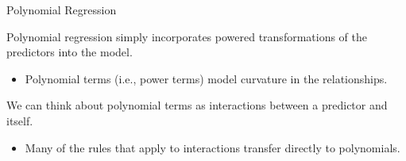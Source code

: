 \documentclass{beamer}\usepackage[]{graphicx}\usepackage[]{color}
\begin{document}
\begin{frame}{Polynomial Regression}
  
  Polynomial regression simply incorporates powered transformations of the
  predictors into the model.
  \vb
  \begin{itemize}
  \item Polynomial terms (i.e., power terms) model curvature in the
    relationships.
  \end{itemize}
  \va
  We can think about polynomial terms as interactions between a predictor and 
  itself.
  \vb
  \begin{itemize}
  \item Many of the rules that apply to interactions transfer directly to
    polynomials.
  \end{itemize}
  
\end{frame}

\watermarkoff %
\end{document}
